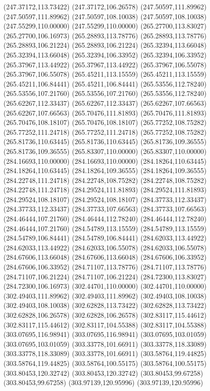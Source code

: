 {(247.37172,113.73422) (247.37172,106.26578) (247.50597,111.89962) (247.50597,111.89962) (247.50597,108.10038) (247.50597,108.10038) (247.55299,110.00000) (247.55299,110.00000)
(265.27700,113.83027) (265.27700,106.16973) (265.28893,113.78776) (265.28893,113.78776) (265.28893,106.21224) (265.28893,106.21224) (265.32394,113.66048) (265.32394,113.66048)
(265.32394,106.33952) (265.32394,106.33952) (265.37967,113.44922) (265.37967,113.44922) (265.37967,106.55078) (265.37967,106.55078) (265.45211,113.15559) (265.45211,113.15559)
(265.45211,106.84441) (265.45211,106.84441) (265.53556,112.78240) (265.53556,107.21760) (265.53556,107.21760) (265.53556,112.78240) (265.62267,112.33437) (265.62267,112.33437)
(265.62267,107.66563) (265.62267,107.66563) (265.70476,111.81893) (265.70476,111.81893) (265.70476,108.18107) (265.70476,108.18107) (265.77252,108.75282) (265.77252,111.24718)
(265.77252,111.24718) (265.77252,108.75282) (265.81736,110.63445) (265.81736,110.63445) (265.81736,109.36555) (265.81736,109.36555) (265.83307,110.00000) (265.83307,110.00000)
(284.16693,110.00000) (284.16693,110.00000) (284.18264,110.63445) (284.18264,110.63445) (284.18264,109.36555) (284.18264,109.36555) (284.22748,111.24718) (284.22748,108.75282)
(284.22748,108.75282) (284.22748,111.24718) (284.29524,111.81893) (284.29524,111.81893) (284.29524,108.18107) (284.29524,108.18107) (284.37733,112.33437) (284.37733,112.33437)
(284.37733,107.66563) (284.37733,107.66563) (284.46444,107.21760) (284.46444,112.78240) (284.46444,112.78240) (284.46444,107.21760) (284.54789,113.15559) (284.54789,113.15559)
(284.54789,106.84441) (284.54789,106.84441) (284.62033,113.44922) (284.62033,113.44922) (284.62033,106.55078) (284.62033,106.55078) (284.67606,113.66048) (284.67606,113.66048)
(284.67606,106.33952) (284.67606,106.33952) (284.71107,113.78776) (284.71107,113.78776) (284.71107,106.21224) (284.71107,106.21224) (284.72300,113.83027) (284.72300,106.16973)
(302.44701,110.00000) (302.44701,110.00000) (302.49403,111.89962) (302.49403,111.89962) (302.49403,108.10038) (302.49403,108.10038) (302.62828,113.73422) (302.62828,113.73422)
(302.62828,106.26578) (302.62828,106.26578) (302.83117,115.44612) (302.83117,115.44612) (302.83117,104.55388) (302.83117,104.55388) (303.07695,116.98941) (303.07695,116.98941)
(303.07695,103.01059) (303.07695,103.01059) (303.33778,101.66911) (303.33778,118.33089) (303.33778,118.33089) (303.33778,101.66911) (303.58764,119.44825) (303.58764,119.44825)
(303.58764,100.55175) (303.58764,100.55175) (303.80453,120.32742) (303.80453,120.32742) (303.80453,99.67258) (303.80453,99.67258) (303.97139,120.95996) (303.97139,120.95996)
}
